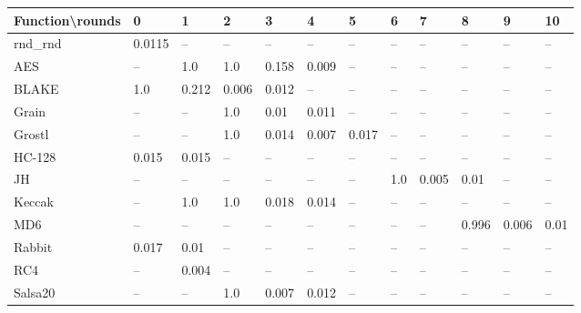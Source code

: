 \documentclass[twoside,a4paper]{article}
\begin{document}
\newcommand{\fd}{\cellcolor{red!13}}
\newcommand{\fn}{\cellcolor{green!13}}

\begin{table}[H]
\centering
\label{res_usable}
\begin{tabular}{l|l l l l l l l l l l l}
Function\textbackslash{}rounds & 0 & 1 & 2 & 3 & 4 & 5 & 6 & 7 & 8 & 9 & 10\\ \hline
rnd\_rnd     & \fn{}0.0115 & --    & --    & --    & --    & --    & --    & --    & --    & --    & --   \\
AES          & \fd{}--    & \fd{}1.0   & \fd{}1.0   & \fd{}0.158 & \fn{}0.009 & \fn{}--    & \fn{}--    & \fn{}--    & \fn{}--    & \fn{}--    & \fn{}--   \\
BLAKE        & \fd{}1.0   & \fd{}0.212 & \fn{}0.006 & \fn{}0.012 & \fn{}--    & \fn{}--    & \fn{}--    & \fn{}--    & \fn{}--    & \fn{}--    & \fn{}--   \\
Grain        & \fd{}--    & \fd{}--    & \fd{}1.0   & \fn{}0.01  & \fn{}0.011 & \fn{}--    & \fn{}--    & \fn{}--    & \fn{}--    & \fn{}--    & \fn{}--   \\
Grostl       & \fd{}--    & \fd{}--    & \fd{}1.0   & \fn{}0.014 & \fn{}0.007 & \fn{}0.017 & \fn{}--    & \fn{}--    & \fn{}--    & \fn{}--    & \fn{}--   \\
HC-128       & \fn{}0.015 & \fn{}0.015 & \fn{}--    & \fn{}--    & \fn{}--    & \fn{}--    & \fn{}--    & \fn{}--    & \fn{}--    & \fn{}--    & \fn{}--   \\
JH           & \fd{}--    & \fd{}--    & \fd{}--    & \fd{}--    & \fd{}--    & \fd{}--    & \fd{}1.0   & \fn{}0.005 & \fn{}0.01  & \fn{}--    & \fn{}--   \\
Keccak       & \fd{}--    & \fd{}1.0   & \fd{}1.0   & \fn{}0.018 & \fn{}0.014 & \fn{}--    & \fn{}--    & \fn{}--    & \fn{}--    & \fn{}--    & \fn{}--   \\
MD6          & \fd{}--    & \fd{}--    & \fd{}--    & \fd{}--    & \fd{}--    & \fd{}--    & \fd{}--    & \fd{}--    & \fd{}0.996 & \fn{}0.006 & \fn{}0.01 \\
Rabbit       & \fn{}0.017 & \fn{}0.01  & \fn{}--    & \fn{}--    & \fn{}--    & \fn{}--    & \fn{}--    & \fn{}--    & \fn{}--    & \fn{}--    & \fn{}--   \\
RC4          & \fd{}--    & \fn{}0.004 & \fn{}--    & \fn{}--    & \fn{}--    & \fn{}--    & \fn{}--    & \fn{}--    & \fn{}--    & \fn{}--    & \fn{}--   \\
Salsa20      & \fd{}--    & \fd{}--    & \fd{}1.0   & \fn{}0.007 & \fn{}0.012 & \fn{}--    & \fn{}--    & \fn{}--    & \fn{}--    & \fn{}--    & \fn{}--   \\

\end{tabular}
\end{table}
\end{document}
